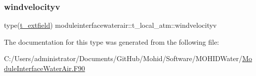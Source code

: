 \mbox{\label{structmoduleinterfacewaterair_1_1t__local__atm_a8cb9729f6da6ed9861f9e4d4f26024f9}} 
\subsubsection{\texorpdfstring{windvelocityv}{windvelocityv}}
{\footnotesize\ttfamily type(\mbox{\hyperlink{structmoduleinterfacewaterair_1_1t__extfield}{t\+\_\+extfield}}) moduleinterfacewaterair\+::t\+\_\+local\+\_\+atm\+::windvelocityv\hspace{0.3cm}{\ttfamily [private]}}



The documentation for this type was generated from the following file\+:\begin{DoxyCompactItemize}
\item 
C\+:/\+Users/administrator/\+Documents/\+Git\+Hub/\+Mohid/\+Software/\+M\+O\+H\+I\+D\+Water/\mbox{\hyperlink{_module_interface_water_air_8_f90}{Module\+Interface\+Water\+Air.\+F90}}\end{DoxyCompactItemize}
